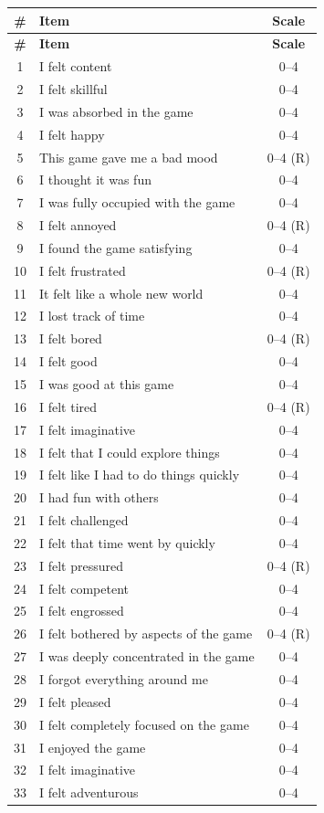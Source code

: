 \documentclass[12pt,a4paper]{report}
\begin{document}
\begin{longtable}{@{}clc@{}}
\toprule
\textbf{\#} & \textbf{Item} & \textbf{Scale} \\
\midrule
\endfirsthead
\toprule
\textbf{\#} & \textbf{Item} & \textbf{Scale} \\
\midrule
\endhead
1 & I felt content & 0--4 \\
2 & I felt skillful & 0--4 \\
3 & I was absorbed in the game & 0--4 \\
4 & I felt happy & 0--4 \\
5 & This game gave me a bad mood & 0--4 (R) \\
6 & I thought it was fun & 0--4 \\
7 & I was fully occupied with the game & 0--4 \\
8 & I felt annoyed & 0--4 (R) \\
9 & I found the game satisfying & 0--4 \\
10 & I felt frustrated & 0--4 (R) \\
11 & It felt like a whole new world & 0--4 \\
12 & I lost track of time & 0--4 \\
13 & I felt bored & 0--4 (R) \\
14 & I felt good & 0--4 \\
15 & I was good at this game & 0--4 \\
16 & I felt tired & 0--4 (R) \\
17 & I felt imaginative & 0--4 \\
18 & I felt that I could explore things & 0--4 \\
19 & I felt like I had to do things quickly & 0--4 \\
20 & I had fun with others & 0--4 \\
21 & I felt challenged & 0--4 \\
22 & I felt that time went by quickly & 0--4 \\
23 & I felt pressured & 0--4 (R) \\
24 & I felt competent & 0--4 \\
25 & I felt engrossed & 0--4 \\
26 & I felt bothered by aspects of the game & 0--4 (R) \\
27 & I was deeply concentrated in the game & 0--4 \\
28 & I forgot everything around me & 0--4 \\
29 & I felt pleased & 0--4 \\
30 & I felt completely focused on the game & 0--4 \\
31 & I enjoyed the game & 0--4 \\
32 & I felt imaginative & 0--4 \\
33 & I felt adventurous & 0--4 \\
\bottomrule
\end{longtable}
\end{document}
